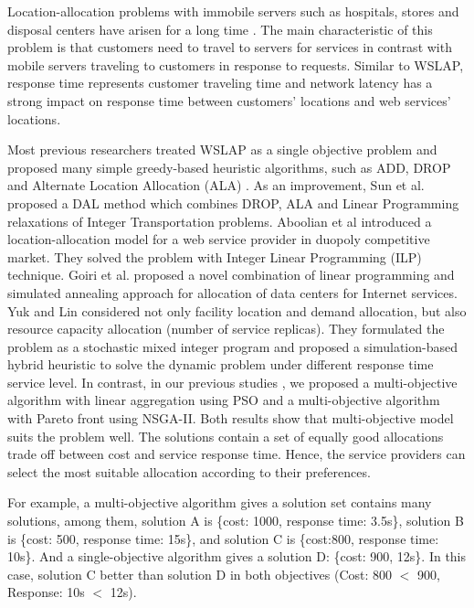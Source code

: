 \documentclass[10pt,journal,compsoc]{IEEEtran}
\begin{document}
Location-allocation problems with immobile servers such as hospitals, stores and disposal centers have arisen for a long time \cite{Vidyarthi201420}. The main characteristic of this problem is that customers need to travel to servers for services in contrast with mobile servers traveling to customers in response to requests. Similar to WSLAP, response time represents customer traveling time and network latency has a strong impact on response time between customers' locations and web services' locations. 



Most previous researchers treated WSLAP as a single objective problem and proposed many simple greedy-based heuristic algorithms, such as ADD, DROP and Alternate Location Allocation (ALA) \cite{Sun}.  As an improvement, Sun et al. \cite{Sun} proposed a DAL method which combines DROP, ALA and Linear Programming relaxations of Integer Transportation problems. Aboolian et al \cite{Aboolian} introduced a location-allocation model for a web service provider in duopoly competitive market. They solved the problem with Integer Linear Programming (ILP) technique. Goiri et al. \cite{5961695} proposed a novel combination of linear programming and simulated annealing approach for allocation of data centers for Internet services. 
Yuk and Lin \cite{lin2014solving} considered not only facility location and demand allocation, but also resource capacity allocation (number of service replicas). They formulated the problem as a stochastic mixed integer program and proposed a simulation-based hybrid heuristic to solve the dynamic problem under different response time service level.
In contrast, in our previous studies \cite{Tan2016a,Tan2016}, we proposed a multi-objective algorithm with linear aggregation using PSO and a multi-objective algorithm with Pareto front using NSGA-II. Both results show that 
multi-objective model suits the problem well. The solutions contain a set of equally good allocations trade off between cost and service response time. Hence, the service providers can select the most suitable allocation according to their preferences. 

For example, a multi-objective algorithm gives a solution set contains many solutions, among them, solution A is \{cost: 1000, response time: 3.5s\}, solution B is \{cost: 500, response time: 15s\}, and solution C is \{cost:800, response time: 10s\}. And a single-objective algorithm gives a solution D: \{cost: 900, 12s\}. In this case, solution C better than solution D in both objectives (Cost: 800 $<$ 900, Response: 10s $<$ 12s).
\end{document}
